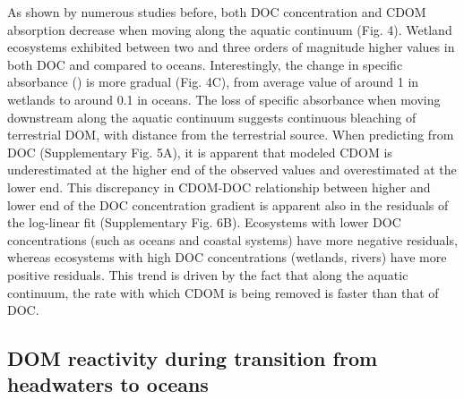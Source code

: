 As shown by numerous studies before, both DOC concentration and CDOM absorption decrease when moving along the aquatic continuum (Fig. 4). Wetland ecosystems exhibited between two and three orders of magnitude higher values in both DOC and  compared to oceans. Interestingly, the change in specific absorbance () is more gradual (Fig. 4C), from average value of around 1 in wetlands to around 0.1 \suvagramm in oceans. The loss of specific absorbance when moving downstream along the aquatic continuum suggests continuous bleaching of terrestrial DOM, with distance from the terrestrial source. When predicting  from DOC (Supplementary Fig. 5A), it is apparent that modeled CDOM is underestimated at the higher end of the observed values and overestimated at the lower end. This discrepancy in CDOM-DOC relationship between higher and lower end of the DOC concentration gradient is apparent also in the residuals of the log-linear fit (Supplementary Fig. 6B). Ecosystems with lower DOC concentrations (such as oceans and coastal systems) have more negative residuals, whereas ecosystems with high DOC concentrations (wetlands, rivers) have more positive residuals. This trend is driven by the fact that along the aquatic continuum, the rate with which CDOM is being removed is faster than that of DOC.

\subsection*{DOM reactivity during transition from headwaters to oceans}


